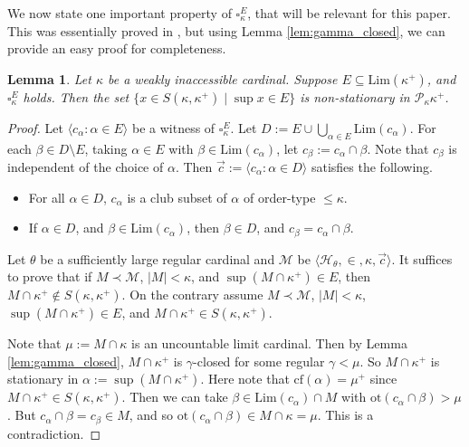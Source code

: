 \documentclass[a4paper,12pt,reqno,oneside]{amsart}
\theoremstyle{plain}
\newtheorem{lemma}[theorem]{Lemma}
\newcommand{\cof}{\mathrm{cf}}
\newcommand{\otp}{\mathrm{ot}}
\newcommand{\mcal}{\mathcal}
\newcommand{\ltpt}{\mathrm{Lim}}
\begin{document}
We now state one important property of $\square_{\kappa}^E$, that will be relevant for this paper. This was essentially proved in \cite{Kr}, but using Lemma \ref{lem:gamma_closed}, we can provide an easy proof for completeness.


\begin{lemma} \label{lem:psquare_S} 
Let $\kappa$ be a weakly inaccessible cardinal. Suppose $E \subseteq \ltpt ( \kappa^+ )$, and $\square_\kappa^E$ holds. Then the set $\{ x \in S( \kappa , \kappa^+ ) \mid \sup x \in E \}$ is non-stationary in $\mcal{P}_\kappa \kappa^+$.
\end{lemma}


\begin{proof}
Let $\langle c_\alpha : \alpha \in E \rangle$ be a witness of $\square_\kappa^E$. Let $D := E \cup \bigcup_{\alpha \in E} \ltpt ( c_\alpha )$. For each $\beta \in D \setminus E$, taking $\alpha \in E$ with $\beta \in \ltpt ( c_\alpha )$, let $c_\beta := c_\alpha \cap \beta$. Note that $c_\beta$ is independent of the choice of $\alpha$. Then $\vec{c} := \langle c_\alpha : \alpha \in D \rangle$ satisfies the following.
\begin{itemize}
\item[(i)] For all $\alpha \in D$, $c_\alpha$ is a club subset of $\alpha$ of order-type $\leq \kappa$.
\item[(ii)] If $\alpha \in D$, and $\beta \in \ltpt ( c_\alpha )$, then $\beta \in D$, and $c_\beta = c_\alpha \cap \beta$.
\end{itemize}

Let $\theta$ be a sufficiently large regular cardinal and $\mcal{M}$ be $\langle \mcal{H}_\theta , \in , \kappa , \vec{c} \rangle$. It suffices to prove that if $M \prec \mcal{M}$, $|M| < \kappa$, and $\sup ( M \cap \kappa^+ ) \in E$, then $M \cap \kappa^+ \notin S( \kappa , \kappa^+ )$. On the contrary assume $M \prec \mcal{M}$, $|M| < \kappa$, $\sup ( M \cap \kappa^+ ) \in E$, and $M \cap \kappa^+ \in S( \kappa , \kappa^+ )$.

Note that $\mu := M \cap \kappa$ is an uncountable limit cardinal. Then by Lemma \ref{lem:gamma_closed}, $M \cap \kappa^+$ is $\gamma$-closed for some regular $\gamma < \mu$. So $M \cap \kappa^+$ is stationary in $\alpha := \sup ( M \cap \kappa^+ )$. Here note that $\cof ( \alpha ) = \mu^+$ since $M \cap \kappa^+ \in S( \kappa , \kappa^+ )$. Then we can take $\beta \in \ltpt ( c_\alpha ) \cap M$ with $\otp ( c_\alpha \cap \beta ) > \mu$. But $c_\alpha \cap \beta = c_\beta \in M$, and so $\otp ( c_\alpha \cap \beta ) \in M \cap \kappa = \mu$. This is a contradiction.
\end{proof}
\end{document}
